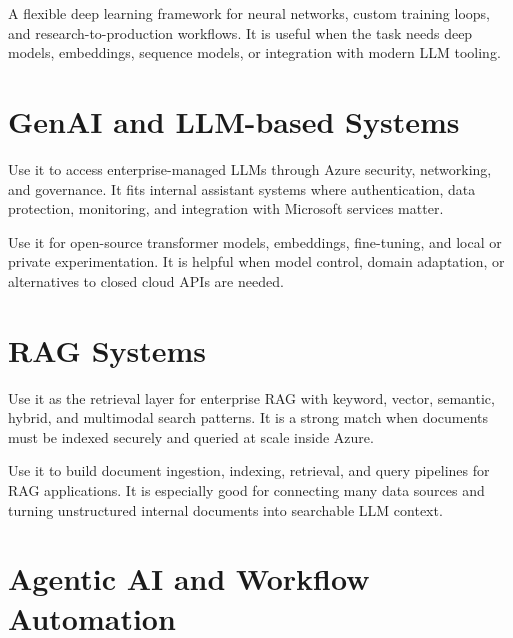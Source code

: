 \documentclass[a4paper]{article}
\begin{document}
\begin{tcolorbox}[title={PyTorch}]
A flexible deep learning framework for neural networks, custom training loops, and research-to-production workflows.
It is useful when the task needs deep models, embeddings, sequence models, or integration with modern LLM tooling.
\end{tcolorbox}

\section{GenAI and LLM-based Systems}

\begin{tcolorbox}[title={Azure OpenAI Service}]
Use it to access enterprise-managed LLMs through Azure security, networking, and governance.
It fits internal assistant systems where authentication, data protection, monitoring, and integration with Microsoft services matter.
\end{tcolorbox}

\begin{tcolorbox}[title={Hugging Face Transformers}]
Use it for open-source transformer models, embeddings, fine-tuning, and local or private experimentation.
It is helpful when model control, domain adaptation, or alternatives to closed cloud APIs are needed.
\end{tcolorbox}

\section{RAG Systems}

\begin{tcolorbox}[title={Azure AI Search}]
Use it as the retrieval layer for enterprise RAG with keyword, vector, semantic, hybrid, and multimodal search patterns.
It is a strong match when documents must be indexed securely and queried at scale inside Azure.
\end{tcolorbox}

\begin{tcolorbox}[title={LlamaIndex}]
Use it to build document ingestion, indexing, retrieval, and query pipelines for RAG applications.
It is especially good for connecting many data sources and turning unstructured internal documents into searchable LLM context.
\end{tcolorbox}

\section{Agentic AI and Workflow Automation}
\end{document}
